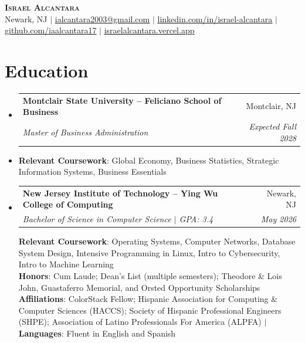 \documentclass[letterpaper,10pt]{article}
\makeatletter
\newcommand{\resumeSubheading}[4]{
  \vspace{-2pt}\item
    \begin{tabular*}{0.97\textwidth}[t]{l@{\extracolsep{\fill}}r}
      \textbf{#1} & #2 \\
      \textit{\small#3} & \textit{\small #4} \\
    \end{tabular*}\vspace{-7pt}
}
\newcommand{\resumeSubHeadingListStart}{\begin{itemize}[leftmargin=0.15in, label={}]}
\newcommand{\resumeSubHeadingListEnd}{\end{itemize}}
\makeatother
\begin{document}
\begin{center}
    \textbf{\Huge \scshape Israel Alcantara} \\ \vspace{2pt}
    \small Newark, NJ $|$
    \href{mailto:ialcantara2003@gmail.com}{\underline{ialcantara2003@gmail.com}} $|$
    \href{https://linkedin.com/in/israel-alcantara}{\underline{linkedin.com/in/israel-alcantara}} $|$
    \href{https://github.com/iaalcantara17}{\underline{github.com/iaalcantara17}} $|$
    \href{https://israelalcantara.vercel.app/}{\underline{israelalcantara.vercel.app}}
\end{center}

\section{Education}
  \resumeSubHeadingListStart
    \resumeSubheading
      {Montclair State University -- Feliciano School of Business}{Montclair, NJ}
      {Master of Business Administration}{Expected Fall 2028}
      \vspace{2pt}\item[] \small \textbf{Relevant Coursework}: Global Economy, Business Statistics, Strategic Information Systems, Business Essentials
    \resumeSubheading
      {New Jersey Institute of Technology -- Ying Wu College of Computing}{Newark, NJ}
      {Bachelor of Science in Computer Science $|$ GPA: 3.4}{May 2026}
      \begin{flushleft}
        \small \textbf{Relevant Coursework}: Operating Systems, Computer Networks, Database System Design, Intensive Programming in Linux, Intro to Cybersecurity, Intro to Machine Learning \\
        \small \textbf{Honors}: Cum Laude; Dean's List (multiple semesters); Theodore \& Lois John, Guastaferro Memorial, and Orsted Opportunity Scholarships \\
        \small \textbf{Affiliations}: ColorStack Fellow; Hispanic Association for Computing \& Computer Sciences (HACCS); Society of Hispanic Professional Engineers (SHPE); Association of Latino Professionals For America (ALPFA) $|$ \textbf{Languages}: Fluent in English and Spanish
      \end{flushleft}
  \resumeSubHeadingListEnd

\end{document}
